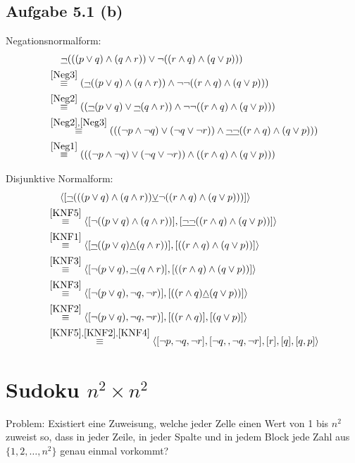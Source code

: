 \documentclass[12pt,a4paper]{article}
\begin{document}
\subsection*{Aufgabe 5.1 (b)}
Negationsnormalform:
\begin{align*}
&~~~~\underline{\neg}(((p\vee q)\wedge(q\wedge r))\vee\neg((r\wedge q)\wedge(q\vee p)))\\
&\stackrel{\ref{Neg3}}{\equiv}
(\underline{\neg}((p\vee q)\wedge(q\wedge r))\wedge\neg\neg((r\wedge q)\wedge(q\vee p)))\\
&\stackrel{\ref{Neg2}}{\equiv}
((\underline{\neg}(p\vee q)\vee\underline{\neg}(q\wedge r))\wedge\neg\neg((r\wedge q)\wedge(q\vee p)))\\
&\stackrel{\ref{Neg2},\ref{Neg3}}{\equiv}
(((\neg p\wedge\neg q)\vee(\neg q\vee\neg r))\wedge\underline{\neg\neg}((r\wedge q)\wedge(q\vee p)))\\
&\stackrel{\ref{Neg1}}{\equiv}
(((\neg p\wedge\neg q)\vee(\neg q\vee\neg r))\wedge((r\wedge q)\wedge(q\vee p)))
\end{align*}

Disjunktive Normalform:
\begin{align*}
&~~~~\langle[\underline{\neg}(((p\vee q)\wedge(q\wedge r))\underline{\vee}\neg((r\wedge q)\wedge(q\vee p)))]\rangle\\
&\stackrel{\ref{KNF5}}{\equiv}
\langle[\neg((p\vee q)\wedge(q\wedge r))],[\underline{\neg\neg}((r\wedge q)\wedge(q\vee p))]\rangle\\
&\stackrel{\ref{KNF1}}{\equiv}
\langle[\underline{\neg}((p\vee q)\underline{\wedge}(q\wedge r))],[((r\wedge q)\wedge(q\vee p))]\rangle\\
&\stackrel{\ref{KNF3}}{\equiv}
\langle[\neg(p\vee q),\underline{\neg}(q\wedge r)],[((r\wedge q)\wedge(q\vee p))]\rangle\\
&\stackrel{\ref{KNF3}}{\equiv}
\langle[\neg(p\vee q),\neg q, \neg r)],[((r\wedge q)\underline{\wedge}(q\vee p))]\rangle\\
&\stackrel{\ref{KNF2}}{\equiv}
\langle[\neg(p\vee q),\neg q, \neg r)],[((r\wedge q)],[(q\vee p)]\rangle\\
&\stackrel{\ref{KNF5},\ref{KNF2},\ref{KNF4}}{\equiv}
\langle[\neg p,\neg q,\neg r],[\neg q,,\neg q, \neg r],[r],[q],[q,p]\rangle\\
\end{align*}

\section*{Sudoku $n^2\times n^2$}
Problem: Existiert eine Zuweisung, welche jeder Zelle einen Wert von 1 bis $n^2$ zuweist so, dass in jeder Zeile, in jeder  Spalte und in jedem Block jede Zahl aus $\lbrace1,2,\ldots,n^2\rbrace$ genau einmal vorkommt?
\end{document}
